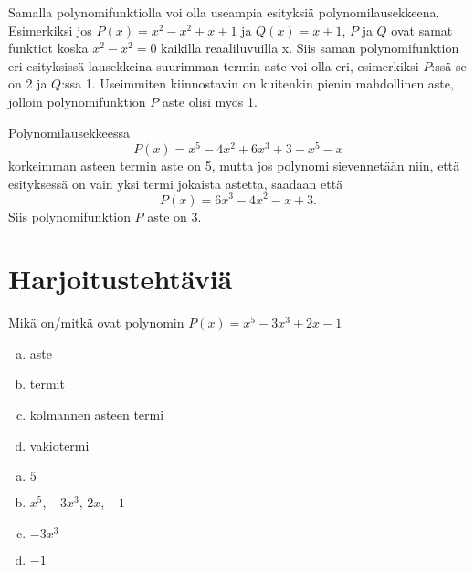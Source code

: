 Samalla polynomifunktiolla voi olla useampia esityksiä polynomilausekkeena.
Esimerkiksi jos $P(x) = x^2-x^2+x+1$ ja $Q(x) = x+1$, $P$ ja $Q$ ovat samat
funktiot koska $x^2 - x^2 = 0$ kaikilla reaaliluvuilla x. Siis saman
polynomifunktion eri esityksissä lausekkeina suurimman termin aste voi olla
eri, esimerkiksi $P$:ssä se on 2 ja $Q$:ssa 1. Useimmiten kiinnostavin on
kuitenkin pienin mahdollinen aste, jolloin polynomifunktion $P$ aste olisi
myös 1.

\begin{esimerkki}
Polynomilausekkeessa
\[P(x) = x^5-4x^2+6x^3+3-x^5-x\]
korkeimman asteen termin aste on 5, mutta jos polynomi sievennetään niin, että
esityksessä on vain yksi termi jokaista astetta, saadaan että
\[P(x) = 6x^3-4x^2-x+3.\]
Siis polynomifunktion $P$ aste on 3.
\end{esimerkki}


\section{Harjoitustehtäviä}

\begin{tehtava}
	Mikä on/mitkä ovat polynomin $P(x) = x^5-3x^3+2x-1$
	\begin{enumerate}[a)]
		\item aste
		\item termit
		\item kolmannen asteen termi
		\item vakiotermi
	\end{enumerate}

	\begin{vastaus}
		\begin{enumerate}[a)]
			\item $5$
			\item $x^5$, $-3x^3$, $2x$, $-1$
			\item $-3x^3$
			\item $-1$
		\end{enumerate}
	\end{vastaus}
\end{tehtava}

